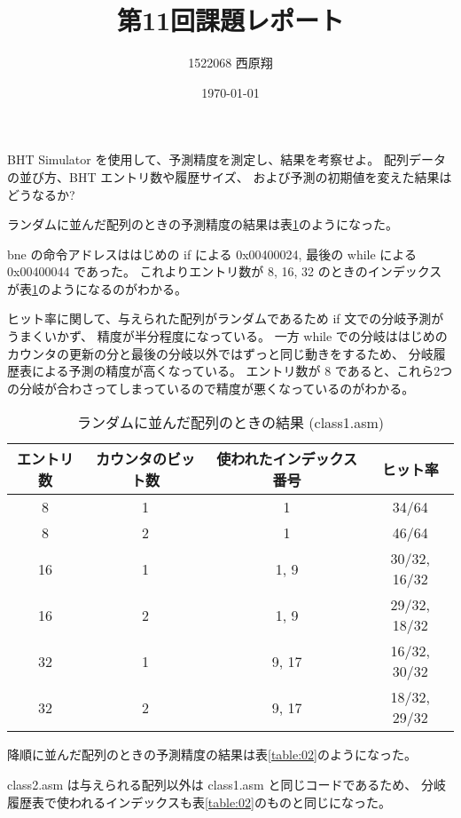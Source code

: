 \documentclass[11pt,dvipdfmx,a4paper]{jsarticle}
\title{第11回課題レポート}
\author{1522068 西原翔}
\date{\today}
\begin{document}
\maketitle

\begin{tcolorbox}[colbacktitle=white, coltitle=black, colback=white, title=課題1]
    BHT Simulator を使用して、予測精度を測定し、結果を考察せよ。
    配列データの並び方、BHT エントリ数や履歴サイズ、
    および予測の初期値を変えた結果はどうなるか?
\end{tcolorbox}

ランダムに並んだ配列のときの予測精度の結果は表\ref{table:01}のようになった。

bne の命令アドレスははじめの if による 0x00400024, 最後の while による 0x00400044 であった。
これよりエントリ数が 8, 16, 32 のときのインデックスが表\ref{table:01}のようになるのがわかる。

ヒット率に関して、与えられた配列がランダムであるため if 文での分岐予測がうまくいかず、
精度が半分程度になっている。
一方 while での分岐ははじめのカウンタの更新の分と最後の分岐以外ではずっと同じ動きをするため、
分岐履歴表による予測の精度が高くなっている。
エントリ数が 8 であると、これら2つの分岐が合わさってしまっているので精度が悪くなっているのがわかる。

\begin{table}[H]
    \centering
    \caption{ランダムに並んだ配列のときの結果 (class1.asm)}
    \label{table:01}
    \begin{tabular}{cccc}
        \hline
        エントリ数 & カウンタのビット数 & 使われたインデックス番号 & ヒット率\\
        \hline
        8 & 1 & 1 & 34/64\\
        8 & 2 & 1 & 46/64\\
        16 & 1 & 1, 9 & 30/32, 16/32\\
        16 & 2 & 1, 9 & 29/32, 18/32\\
        32 & 1 & 9, 17 & 16/32, 30/32\\
        32 & 2 & 9, 17 & 18/32, 29/32\\
        \hline
    \end{tabular}
\end{table}

降順に並んだ配列のときの予測精度の結果は表\ref{table:02}のようになった。

class2.asm は与えられる配列以外は class1.asm と同じコードであるため、
分岐履歴表で使われるインデックスも表\ref{table:02}のものと同じになった。
\end{document}
